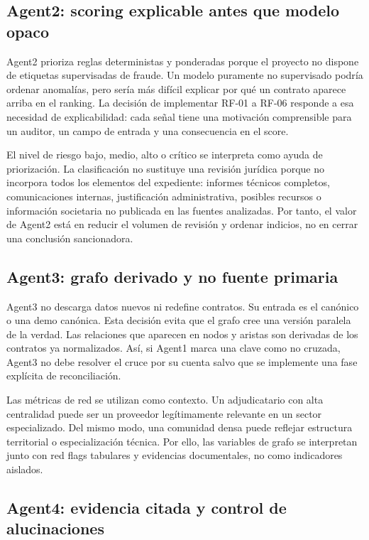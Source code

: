 \documentclass[11pt,a4paper,spanish]{book}
\numberwithin{equation}{chapter}
\numberwithin{figure}{chapter}
\begin{document}
\subsection{Agent2: scoring explicable antes que modelo opaco}

Agent2 prioriza reglas deterministas y ponderadas porque el proyecto no dispone de etiquetas
supervisadas de fraude. Un modelo puramente no supervisado podr{\'i}a ordenar anomal{\'i}as, pero ser{\'i}a
m{\'a}s dif{\'i}cil explicar por qu{\'e} un contrato aparece arriba en el ranking. La decisi{\'o}n de
implementar RF-01 a RF-06 responde a esa necesidad de explicabilidad: cada se{\~n}al tiene una
motivaci{\'o}n comprensible para un auditor, un campo de entrada y una consecuencia en el score.

El nivel de riesgo bajo, medio, alto o cr{\'i}tico se interpreta como ayuda de priorizaci{\'o}n. La
clasificaci{\'o}n no sustituye una revisi{\'o}n jur{\'i}dica porque no incorpora todos los elementos del
expediente: informes t{\'e}cnicos completos, comunicaciones internas, justificaci{\'o}n administrativa,
posibles recursos o informaci{\'o}n societaria no publicada en las fuentes analizadas. Por tanto, el
valor de Agent2 est{\'a} en reducir el volumen de revisi{\'o}n y ordenar indicios, no en cerrar una
conclusi{\'o}n sancionadora.

\subsection{Agent3: grafo derivado y no fuente primaria}

Agent3 no descarga datos nuevos ni redefine contratos. Su entrada es el can{\'o}nico o una demo
can{\'o}nica. Esta decisi{\'o}n evita que el grafo cree una versi{\'o}n paralela de la verdad. Las
relaciones que aparecen en nodos y aristas son derivadas de los contratos ya normalizados. As{\'i}, si
Agent1 marca una clave como no cruzada, Agent3 no debe resolver el cruce por su cuenta salvo que se
implemente una fase expl{\'i}cita de reconciliaci{\'o}n.

Las m{\'e}tricas de red se utilizan como contexto. Un adjudicatario con alta centralidad puede ser un
proveedor leg{\'i}timamente relevante en un sector especializado. Del mismo modo, una comunidad densa
puede reflejar estructura territorial o especializaci{\'o}n t{\'e}cnica. Por ello, las variables de
grafo se interpretan junto con red flags tabulares y evidencias documentales, no como indicadores
aislados.

\subsection{Agent4: evidencia citada y control de alucinaciones}
\end{document}
